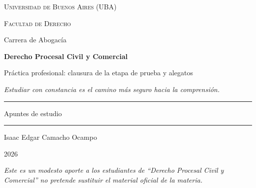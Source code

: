 \documentclass[12pt,oneside]{book}
\newcommand{\universidad}{Universidad de Buenos Aires (UBA)}
\newcommand{\facultad}{Facultad de Derecho}
\newcommand{\carrera}{Carrera de Abogacía}
\newcommand{\materia}{Derecho Procesal Civil y Comercial}
\newcommand{\titulo}{Práctica profesional: clausura de la etapa de prueba y alegatos}
\newcommand{\autor}{Isaac Edgar Camacho Ocampo}
\newcommand{\anio}{2026}
\begin{document}

\begin{titlepage}

\thispagestyle{empty}

\begin{center}

\vspace*{1cm}

{\large \textsc{\universidad}}

\vspace{0.2cm}

{\large \textsc{\facultad}}

\vspace{0.2cm}

{\large \carrera}

\vspace{3cm}

{\Huge \textbf{\materia}}

\vspace{1cm}

{\LARGE \titulo}

\vspace{0.8cm}

\textit{Estudiar con constancia es el camino más seguro hacia la comprensión.}

\vspace{1.2cm}

\rule{0.70\textwidth}{0.5pt}

\vspace{0.5cm}

{\large Apuntes de estudio}

\vspace{0.5cm}

\rule{0.70\textwidth}{0.5pt}

\vfill

{\large \autor}

\vspace{0.3cm}

{\large \anio}

\end{center}

\vfill

\begin{flushleft}
\textit{Este es un modesto aporte a los estudiantes de ``\materia'' no pretende sustituir el material oficial de la materia.}
\end{flushleft}

\end{titlepage}
\end{document}
